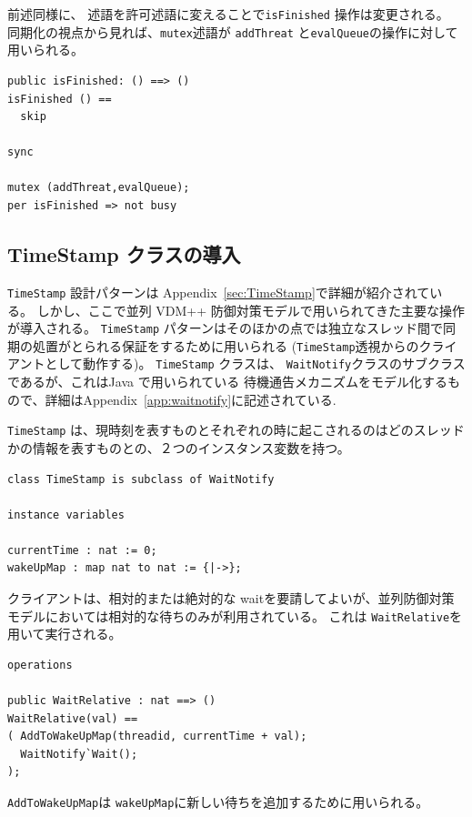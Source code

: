 \documentclass[\pformat,12pt]{jreport}
\begin{document}
前述同様に、 述語を許可述語に変えることで\texttt{isFinished} 操作は変更される。
同期化の視点から見れば、\texttt{mutex}述語が \texttt{addThreat} と\texttt{evalQueue}の操作に対して用いられる。

\begin{lstlisting}
public isFinished: () ==> ()
isFinished () == 
  skip

sync

mutex (addThreat,evalQueue);
per isFinished => not busy
\end{lstlisting}

\subsection{TimeStamp クラスの導入}

 \texttt{TimeStamp} 設計パターンは Appendix~\ref{sec:TimeStamp}で詳細が紹介されている。 
しかし、ここで並列  VDM++ 防御対策モデルで用いられてきた主要な操作が導入される。
 \texttt{TimeStamp} パターンはそのほかの点では独立なスレッド間で同期の処置がとられる保証をするために用いられる (\texttt{TimeStamp}透視からのクライアントとして動作する)。 
 \texttt{TimeStamp} クラスは、  \texttt{WaitNotify}クラスのサブクラスであるが、これはJava \cite{Gosling&00} で用いられている 待機通告メカニズムをモデル化するもので、詳細はAppendix~\ref{app:waitnotify}に記述されている.

\texttt{TimeStamp} は、現時刻を表すものとそれぞれの時に起こされるのはどのスレッドかの情報を表すものとの、２つのインスタンス変数を持つ。

\begin{lstlisting}
class TimeStamp is subclass of WaitNotify

instance variables
  
currentTime : nat := 0;
wakeUpMap : map nat to nat := {|->};
\end{lstlisting}

クライアントは、相対的または絶対的な waitを要請してよいが、並列防御対策モデルにおいては相対的な待ちのみが利用されている。
これは \texttt{WaitRelative}を用いて実行される。

\begin{lstlisting}
operations

public WaitRelative : nat ==> ()
WaitRelative(val) ==
( AddToWakeUpMap(threadid, currentTime + val);
  WaitNotify`Wait();
);
\end{lstlisting}

\texttt{AddToWakeUpMap}は \texttt{wakeUpMap}に新しい待ちを追加するために用いられる。
\end{document}
